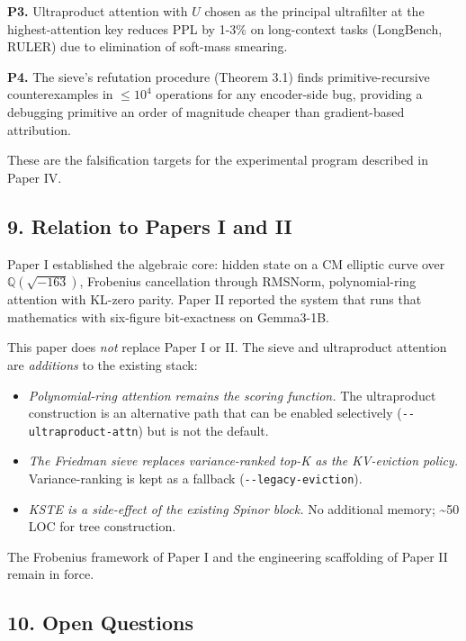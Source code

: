 \documentclass[
  11pt,
]{article}
\providecommand{\tightlist}{%
  \setlength{\itemsep}{0pt}\setlength{\parskip}{0pt}}
\begin{document}
\textbf{P3.} Ultraproduct attention with \(U\) chosen as the principal
ultrafilter at the highest-attention key reduces PPL by 1-3\% on
long-context tasks (LongBench, RULER) due to elimination of soft-mass
smearing.

\textbf{P4.} The sieve's refutation procedure (Theorem 3.1) finds
primitive-recursive counterexamples in \(\le 10^4\) operations for any
encoder-side bug, providing a debugging primitive an order of magnitude
cheaper than gradient-based attribution.

These are the falsification targets for the experimental program
described in Paper IV.

\hypertarget{relation-to-papers-i-and-ii}{%
\subsection{9. Relation to Papers I and
II}\label{relation-to-papers-i-and-ii}}

Paper I established the algebraic core: hidden state on a CM elliptic
curve over \(\mathbb{Q}(\sqrt{-163})\), Frobenius cancellation through
RMSNorm, polynomial-ring attention with KL-zero parity. Paper II
reported the system that runs that mathematics with six-figure
bit-exactness on Gemma3-1B.

This paper does \emph{not} replace Paper I or II. The sieve and
ultraproduct attention are \emph{additions} to the existing stack:

\begin{itemize}
\tightlist
\item
  \emph{Polynomial-ring attention remains the scoring function.} The
  ultraproduct construction is an alternative path that can be enabled
  selectively (\texttt{-\/-ultraproduct-attn}) but is not the default.
\item
  \emph{The Friedman sieve replaces variance-ranked top-K as the
  KV-eviction policy.} Variance-ranking is kept as a fallback
  (\texttt{-\/-legacy-eviction}).
\item
  \emph{KSTE is a side-effect of the existing Spinor block.} No
  additional memory; \textasciitilde50 LOC for tree construction.
\end{itemize}

The Frobenius framework of Paper I and the engineering scaffolding of
Paper II remain in force.

\hypertarget{open-questions}{%
\subsection{10. Open Questions}\label{open-questions}}
\end{document}
